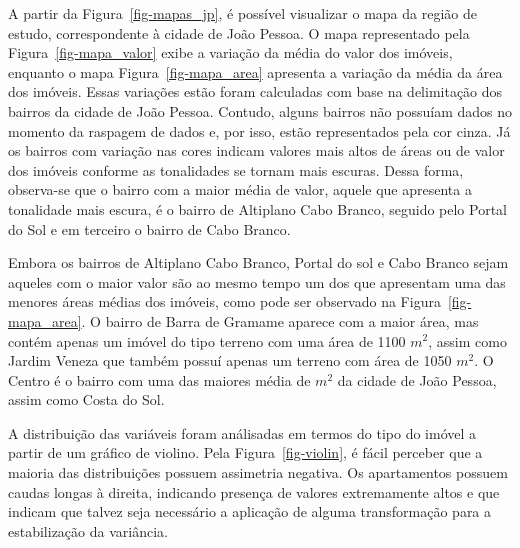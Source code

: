 \documentclass[
  12pt,
  a4paper,
]{scrreprt}
\begin{document}
A partir da Figura~\ref{fig-mapas_jp}, é possível visualizar o mapa da
região de estudo, correspondente à cidade de João Pessoa. O mapa
representado pela Figura~\ref{fig-mapa_valor} exibe a variação da média
do valor dos imóveis, enquanto o mapa Figura~\ref{fig-mapa_area}
apresenta a variação da média da área dos imóveis. Essas variações estão
foram calculadas com base na delimitação dos bairros da cidade de João
Pessoa. Contudo, alguns bairros não possuíam dados no momento da
raspagem de dados e, por isso, estão representados pela cor cinza. Já os
bairros com variação nas cores indicam valores mais altos de áreas ou de
valor dos imóveis conforme as tonalidades se tornam mais escuras. Dessa
forma, observa-se que o bairro com a maior média de valor, aquele que
apresenta a tonalidade mais escura, é o bairro de Altiplano Cabo Branco,
seguido pelo Portal do Sol e em terceiro o bairro de Cabo Branco.

\vspace{12pt}

Embora os bairros de Altiplano Cabo Branco, Portal do sol e Cabo Branco
sejam aqueles com o maior valor são ao mesmo tempo um dos que apresentam
uma das menores áreas médias dos imóveis, como pode ser observado na
Figura~\ref{fig-mapa_area}. O bairro de Barra de Gramame aparece com a
maior área, mas contém apenas um imóvel do tipo terreno com uma área de
1100 \(m^2\), assim como Jardim Veneza que também possuí apenas um
terreno com área de 1050 \(m^2\). O Centro é o bairro com uma das
maiores média de \(m^2\) da cidade de João Pessoa, assim como Costa do
Sol.

\vspace{12pt}

A distribuição das variáveis foram análisadas em termos do tipo do
imóvel a partir de um gráfico de violino. Pela Figura~\ref{fig-violin},
é fácil perceber que a maioria das distribuições possuem assimetria
negativa. Os apartamentos possuem caudas longas à direita, indicando
presença de valores extremamente altos e que indicam que talvez seja
necessário a aplicação de alguma transformação para a estabilização da
variância.
\end{document}
